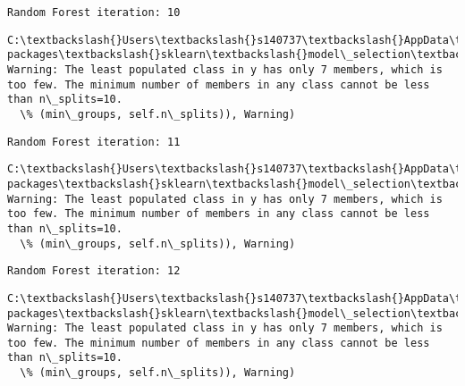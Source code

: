 \documentclass[11pt]{article}
\begin{document}
    \begin{Verbatim}[commandchars=\\\{\}]
Random Forest iteration: 10 

    \end{Verbatim}

    \begin{Verbatim}[commandchars=\\\{\}]
C:\textbackslash{}Users\textbackslash{}s140737\textbackslash{}AppData\textbackslash{}Local\textbackslash{}Continuum\textbackslash{}anaconda3\textbackslash{}lib\textbackslash{}site-packages\textbackslash{}sklearn\textbackslash{}model\_selection\textbackslash{}\_split.py:605: Warning: The least populated class in y has only 7 members, which is too few. The minimum number of members in any class cannot be less than n\_splits=10.
  \% (min\_groups, self.n\_splits)), Warning)

    \end{Verbatim}

    \begin{Verbatim}[commandchars=\\\{\}]
Random Forest iteration: 11 

    \end{Verbatim}

    \begin{Verbatim}[commandchars=\\\{\}]
C:\textbackslash{}Users\textbackslash{}s140737\textbackslash{}AppData\textbackslash{}Local\textbackslash{}Continuum\textbackslash{}anaconda3\textbackslash{}lib\textbackslash{}site-packages\textbackslash{}sklearn\textbackslash{}model\_selection\textbackslash{}\_split.py:605: Warning: The least populated class in y has only 7 members, which is too few. The minimum number of members in any class cannot be less than n\_splits=10.
  \% (min\_groups, self.n\_splits)), Warning)

    \end{Verbatim}

    \begin{Verbatim}[commandchars=\\\{\}]
Random Forest iteration: 12 

    \end{Verbatim}

    \begin{Verbatim}[commandchars=\\\{\}]
C:\textbackslash{}Users\textbackslash{}s140737\textbackslash{}AppData\textbackslash{}Local\textbackslash{}Continuum\textbackslash{}anaconda3\textbackslash{}lib\textbackslash{}site-packages\textbackslash{}sklearn\textbackslash{}model\_selection\textbackslash{}\_split.py:605: Warning: The least populated class in y has only 7 members, which is too few. The minimum number of members in any class cannot be less than n\_splits=10.
  \% (min\_groups, self.n\_splits)), Warning)

    \end{Verbatim}
\end{document}
